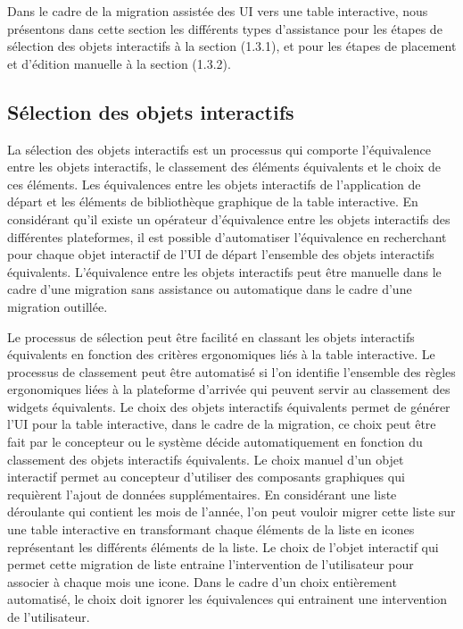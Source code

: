 Dans le cadre de la migration assistée des UI vers une table interactive, nous présentons dans cette section les différents types d'assistance pour les étapes de sélection des objets interactifs à la section (1.3.1), et pour les étapes de placement et d'édition manuelle à la section (1.3.2). 

{\raggedright \subsection{Sélection des objets interactifs}}
La sélection des objets interactifs est un processus qui comporte l'équivalence entre les objets interactifs, le classement des éléments équivalents et le choix de ces éléments. 
Les équivalences entre les objets interactifs de l'application de départ et les éléments de bibliothèque graphique de la table interactive. En considérant qu'il existe un opérateur d'équivalence entre les objets interactifs des différentes plateformes, il est possible d'automatiser l'équivalence en recherchant pour chaque objet interactif de l'UI de départ l'ensemble des objets interactifs équivalents. L'équivalence entre les objets interactifs peut être manuelle dans le cadre d'une migration sans assistance ou automatique dans le cadre d'une migration outillée.

Le processus de sélection peut être facilité en classant les objets interactifs équivalents en fonction des critères ergonomiques liés à la table interactive. Le processus de classement peut être automatisé si l'on identifie l'ensemble des règles ergonomiques liées à la plateforme d'arrivée qui peuvent servir au classement des widgets équivalents.
Le choix des objets interactifs équivalents permet de générer l'UI pour la table interactive, dans le cadre de la migration, ce choix peut être fait par le concepteur ou le système décide automatiquement en fonction du classement des objets interactifs équivalents. Le choix manuel d'un objet interactif permet au concepteur d'utiliser des composants graphiques qui requièrent l'ajout de données supplémentaires. En considérant une liste déroulante qui contient les mois de l'année, l'on peut vouloir migrer cette liste sur une table interactive en transformant chaque éléments de la liste en icones représentant les différents éléments de la liste. Le choix de l'objet interactif qui permet cette migration de liste entraine l'intervention de l'utilisateur pour associer à chaque mois une icone. Dans le cadre d'un choix entièrement automatisé, le choix doit ignorer les équivalences qui entrainent une intervention de l'utilisateur. 


